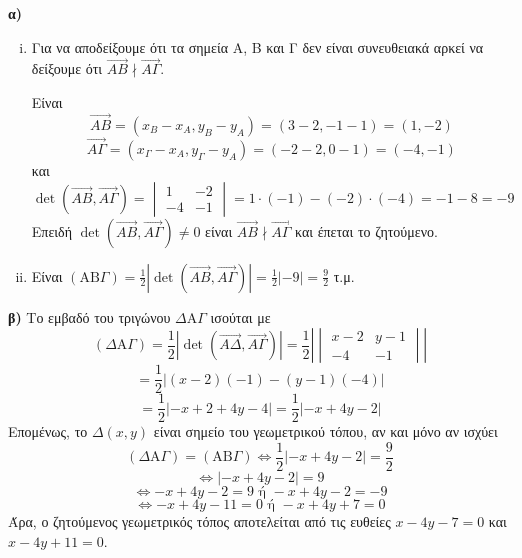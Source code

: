 \hfill \break
\textbf{α)}
\begin{enumerate}[i.]
    \item Για να αποδείξουμε ότι τα σημεία Α, Β και Γ δεν είναι συνευθειακά αρκεί να δείξουμε ότι $\vec{AB} \nmid \vec{A\Gamma}$.

    Είναι
    \[
        \vec{AB} = (x_B - x_A, y_B - y_A) = (3-2, -1-1) = (1,-2)
    \]
    \[
        \vec{A\Gamma} = (x_\Gamma - x_A, y_\Gamma - y_A) = (-2-2, 0-1) = (-4,-1)
    \]
    και
    \[
        \det(\vec{AB}, \vec{A\Gamma}) = \begin{vmatrix} 1 & -2 \\ -4 & -1 \end{vmatrix} = 1 \cdot (-1) - (-2) \cdot (-4) = -1 - 8 = -9
    \]
    Επειδή $\det(\vec{AB}, \vec{A\Gamma}) \ne 0$ είναι $\vec{AB} \nmid \vec{A\Gamma}$ και έπεται το ζητούμενο.

    \item Είναι $\left( \text{AB}\Gamma \right) = \frac{1}{2} \left| \det(\vec{AB}, \vec{A\Gamma}) \right| = \frac{1}{2} \left| -9 \right| = \frac{9}{2}$ τ.μ.
\end{enumerate}

\textbf{β)} Το εμβαδό του τριγώνου $\Delta \text{A}\Gamma$ ισούται με
\[
    (\Delta \text{A}\Gamma) = \frac{1}{2} |\det(\vec{A\Delta}, \vec{A\Gamma})| = \frac{1}{2} \left| \begin{vmatrix} x-2 & y-1 \\ -4 & -1 \end{vmatrix} \right|
\]
\[
    = \frac{1}{2} |(x-2)(-1) - (y-1)(-4)|
\]
\[
    = \frac{1}{2} |-x+2+4y-4| = \frac{1}{2} |-x+4y-2|
\]
Επομένως, το $\Delta(x,y)$ είναι σημείο του γεωμετρικού τόπου, αν και μόνο αν ισχύει
\[
    (\Delta \text{A}\Gamma) = (\text{AB}\Gamma) \iff \frac{1}{2} |-x+4y-2| = \frac{9}{2}
\]
\[
    \iff |-x+4y-2| = 9
\]
\[
    \iff -x+4y-2 = 9 \text{ ή } -x+4y-2 = -9
\]
\[
    \iff -x+4y-11 = 0 \text{ ή } -x+4y+7 = 0
\]
Άρα, ο ζητούμενος γεωμετρικός τόπος αποτελείται από τις ευθείες $x-4y-7=0$ και $x-4y+11=0$.

